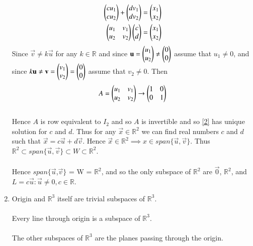 \documentclass[journal,12pt,twocolumn]{IEEEtran}
\begin{document}
\begin{enumerate}[label=\alph*.]
\begin{align}
	\label{1}\begin{pmatrix}cu_1\\cu_2\end{pmatrix} + \begin{pmatrix}dv_1\\dv_2\end{pmatrix} = \begin{pmatrix}x_1\\x_2\end{pmatrix}\\
	\label{2}\begin{pmatrix}u_1 & v_1\\u_2 & v_2\end{pmatrix}\begin{pmatrix}c\\d\end{pmatrix} = \begin{pmatrix}x_1\\x_2\end{pmatrix}
\end{align}
Since $\vec{v} \neq k\vec{u}$ for any $k \in \mathbb{R}$ and since $\mathbf{u} = \begin{pmatrix}u_1 \\ u_2\end{pmatrix} \neq \begin{pmatrix}0\\0\end{pmatrix}$ assume that $u_1 \neq 0$, and since $k\mathbf{u} \neq \mathbf{v} = \begin{pmatrix}v_1\\v_2\end{pmatrix} = \begin{pmatrix}0\\0\end{pmatrix}$ assume that $v_2 \neq 0$. Then
\begin{align}\label{3}
	A = \begin{pmatrix}u_1 & v_1\\u_2 & v_2\end{pmatrix} \rightarrow \begin{pmatrix}1 & 0\\0 & 1\end{pmatrix}
\end{align}
\\
Hence $A$ is row equivalent to $I_2$ and so $A$ is invertible and so \eqref{2} has unique solution for $c$ and $d$. Thus for any $\vec{x} \in \mathbb{R}^2$ we can find real numbers $c$ and $d$ such that $\vec{x} = c\vec{u} + d\vec{v}$. Hence $\vec{x} \in \mathbb{R}^2 \implies x \in span\{\vec{u},\vec{v}\}$. Thus $\mathbb{R}^2 \subset span\{\vec{u},\vec{v}\} \subset W \subset \mathbb{R}^2$.\\
\\
Hence $span\{ \vec{u}$,$\vec{v} \}$ = W = $\mathbb{R}^2$, and so the only subspace of $\mathbb{R}^2$ are ${\vec{0}}$, $\mathbb{R}^2$, and $L = {c\vec{u} : \vec{u} \neq 0, c \in \mathbb{R}}$.
\\
\item
Origin and $\mathbb{R}^3$ itself are trivial subspaces of $\mathbb{R}^3$.\\
\\
Every line through origin is a subspace of $\mathbb{R}^3$.\\
\\
The other subspaces of $\mathbb{R}^3$ are the planes passing through the origin.
\end{enumerate}
\end{document}
